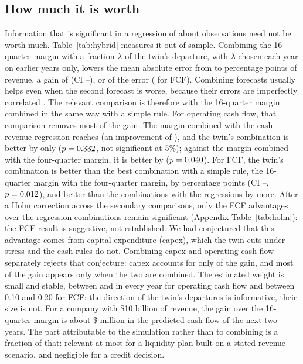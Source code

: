 \documentclass[11pt]{article}
\begin{document}
\subsection{How much it is worth}
Information that is significant in a regression of about \TrNRound{} observations need not be worth much. Table~\ref{tab:hybrid} measures it out of sample. Combining the 16-quarter margin with a fraction $\lambda$ of the twin's departure, with $\lambda$ chosen each year on earlier years only, lowers the mean absolute error from \TrHybSixteen{} to \TrHybSixteenTwin{} percentage points of revenue, a gain of \TrHybGain{} (CI \TrHybGainLo--\TrHybGainHi), or \TrHybGainPct{} of the error (\TrFcfHybGainPct{} for FCF). Combining forecasts usually helps even when the second forecast is worse, because their errors are imperfectly correlated \citep{bates1969,clemen1989,timmermann2006}. The relevant comparison is therefore with the 16-quarter margin combined in the same way with a simple rule. For operating cash flow, that comparison removes most of the gain. The margin combined with the cash-revenue regression reaches \TrHybSixteenRegFive{} (an improvement of \TrHybRegFiveGainPct), and the twin's combination is better by only \TrHybVsRegFive{} ($p=0.332$, not significant at 5\%); against the margin combined with the four-quarter margin, it is better by \TrHybVsFour{} ($p=0.040$). For FCF, the twin's combination is better than the best combination with a simple rule, the 16-quarter margin with the four-quarter margin, by \TrFcfVsBestNull{} percentage points (CI \TrFcfVsBestNullLo--\TrFcfVsBestNullHi, $p=0.012$), and better than the combinations with the regressions by more. After a Holm correction across the secondary comparisons, only the FCF advantages over the regression combinations remain significant (Appendix Table~\ref{tab:holm}): the FCF result is suggestive, not established. We had conjectured that this advantage comes from capital expenditure (capex), which the twin cuts under stress and the cash rules do not. Combining capex and operating cash flow separately rejects that conjecture: capex accounts for only \FcfCapexShare{} of the gain, and most of the gain appears only when the two are combined. The estimated weight is small and stable, between \TrLambdaLo{} and \TrLambdaHi{} in every year for operating cash flow and between 0.10 and 0.20 for FCF: the direction of the twin's departures is informative, their size is not. For a company with \$10 billion of revenue, the gain over the 16-quarter margin is about \$\TrHybDollar{} million in the predicted cash flow of the next two years. The part attributable to the simulation rather than to combining is a fraction of that: relevant at most for a liquidity plan built on a stated revenue scenario, and negligible for a credit decision.
\end{document}
